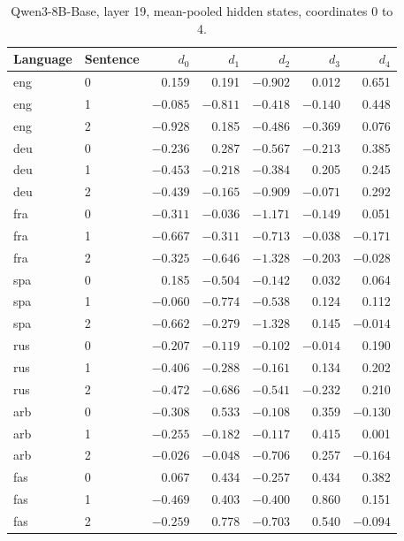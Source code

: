 \begin{table}[h]\centering\small
\caption{Qwen3-8B-Base, layer 19, mean-pooled hidden states, coordinates 0 to 4.}
\label{tab:rawvals}
\begin{tabular}{llrrrrr}
\toprule
Language & Sentence & $d_0$ & $d_1$ & $d_2$ & $d_3$ & $d_4$ \\
\midrule
eng & 0 & 0.159 & 0.191 & $-0.902$ & 0.012 & 0.651 \\
eng & 1 & $-0.085$ & $-0.811$ & $-0.418$ & $-0.140$ & 0.448 \\
eng & 2 & $-0.928$ & 0.185 & $-0.486$ & $-0.369$ & 0.076 \\
deu & 0 & $-0.236$ & 0.287 & $-0.567$ & $-0.213$ & 0.385 \\
deu & 1 & $-0.453$ & $-0.218$ & $-0.384$ & 0.205 & 0.245 \\
deu & 2 & $-0.439$ & $-0.165$ & $-0.909$ & $-0.071$ & 0.292 \\
fra & 0 & $-0.311$ & $-0.036$ & $-1.171$ & $-0.149$ & 0.051 \\
fra & 1 & $-0.667$ & $-0.311$ & $-0.713$ & $-0.038$ & $-0.171$ \\
fra & 2 & $-0.325$ & $-0.646$ & $-1.328$ & $-0.203$ & $-0.028$ \\
spa & 0 & 0.185 & $-0.504$ & $-0.142$ & 0.032 & 0.064 \\
spa & 1 & $-0.060$ & $-0.774$ & $-0.538$ & 0.124 & 0.112 \\
spa & 2 & $-0.662$ & $-0.279$ & $-1.328$ & 0.145 & $-0.014$ \\
rus & 0 & $-0.207$ & $-0.119$ & $-0.102$ & $-0.014$ & 0.190 \\
rus & 1 & $-0.406$ & $-0.288$ & $-0.161$ & 0.134 & 0.202 \\
rus & 2 & $-0.472$ & $-0.686$ & $-0.541$ & $-0.232$ & 0.210 \\
arb & 0 & $-0.308$ & 0.533 & $-0.108$ & 0.359 & $-0.130$ \\
arb & 1 & $-0.255$ & $-0.182$ & $-0.117$ & 0.415 & 0.001 \\
arb & 2 & $-0.026$ & $-0.048$ & $-0.706$ & 0.257 & $-0.164$ \\
fas & 0 & 0.067 & 0.434 & $-0.257$ & 0.434 & 0.382 \\
fas & 1 & $-0.469$ & 0.403 & $-0.400$ & 0.860 & 0.151 \\
fas & 2 & $-0.259$ & 0.778 & $-0.703$ & 0.540 & $-0.094$ \\
\bottomrule
\end{tabular}
\end{table}

